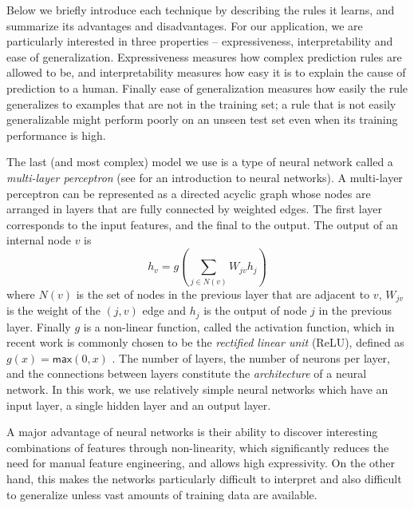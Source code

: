 Below we briefly introduce each technique by describing the rules it learns, and summarize its advantages and
disadvantages.
%
For our application, we are particularly interested in three properties -- expressiveness, interpretability and ease of
generalization.
%
Expressiveness measures how complex prediction rules are allowed to be, and interpretability measures how easy it is to
explain the cause of prediction to a human.
%
Finally ease of generalization measures how easily the rule generalizes to examples that are not in the training set; a
rule that is not easily generalizable might perform poorly on an unseen test set even when its training performance is
high.


%
The last (and most complex) model we use is a type of neural network called a \emph{multi-layer perceptron} (see
\citealt{Nielsen2015-pu} for an introduction to neural networks).
%
A multi-layer perceptron can be represented as a directed acyclic graph whose nodes are arranged in layers that are
fully connected by weighted edges.
%
The first layer corresponds to the input features, and the final to the output.
%
The output of an internal node $v$ is
%
\[ h_v = g(\sum_{j \in N(v)} W_{jv} h_j ) \]
%
where $N(v)$ is the set of nodes in the previous layer that are adjacent to $v$, $W_{jv}$ is the weight of the $(j, v)$
edge and $h_j$ is the output of node $j$ in the previous layer.
%
Finally $g$ is a non-linear function, called the activation function, which in recent work is commonly chosen to be the
\emph{rectified linear unit} (ReLU), defined as $g(x) = \mathsf{max}(0,x)$ \citep{Nair2010-xg}.
%
The number of layers, the number of neurons per layer, and the connections between layers constitute the
\emph{architecture} of a neural network.
%
In this work, we use relatively simple neural networks which have an input layer, a single hidden layer and an output
layer.

A major advantage of neural networks is their ability to discover interesting combinations of features through
non-linearity, which significantly reduces the need for manual feature engineering, and allows high expressivity.
%
On the other hand, this makes the networks particularly difficult to interpret and also difficult to generalize unless
vast amounts of training data are available.


\lstMakeShortInline{|}
